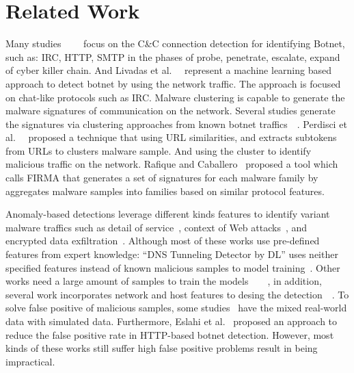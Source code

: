 \section{Related Work}

Many studies~\cite{feily2009survey}~\cite{barford2007inside}~\cite{strayer2008botnet}~\cite{atluri2017botnets} focus on the C\&C connection detection for identifying Botnet, such as: IRC, HTTP, SMTP in the phases of probe, penetrate, escalate, expand of cyber killer chain. And Livadas et al.~\cite{carl2006using}~\cite{strayer2006detecting} represent a machine learning based approach to detect botnet by using the network traffic. The approach is focused on chat-like protocols such as IRC. Malware clustering is capable to generate the malware signatures of communication on the network. Several studies generate the signatures via clustering approaches from known botnet traffics~\cite{p:zarras14}~\cite{nelms2013execscent}. Perdisci et al.~\cite{perdisci2013scalable}~\cite{perdisci2010behavioral} proposed a technique that using URL similarities, and extracts subtokens from URLs to clusters malware sample. And using the cluster to identify malicious traffic on the network. Rafique and Caballero~\cite{rafique2013firma} proposed a tool which calls FIRMA that generates a set of signatures for each malware family by aggregates malware samples into families based on similar protocol features.  

Anomaly-based detections leverage different kinds features to identify variant malware traffics such as detail of service~\cite{p:feinstein03}, context of Web attacks~\cite{p:krugel03}, and encrypted data exfiltration~\cite{p:he14}.  Although most of these works use pre-defined features from expert knowledge: “DNS Tunneling Detector by DL” uses neither specified features instead of known malicious samples to model training~\cite{j:zhang16}. Other works need a large amount of samples to train the models~\cite{bilge2012disclosure}~\cite{gu2008botminer}~\cite{binkley2006algorithm}~\cite{karasaridis2007wide}, in addition, several work incorporates network and host features to desing the detection~\cite{p:schwenk11}~\cite{borders2004web}.  To solve false positive of malicious samples, some studies~\cite{wang2018botcapturer} have the mixed real-world data with simulated data. Furthermore, Eslahi et al.~\cite{eslahi2013efficient} proposed an approach to reduce the false positive rate in HTTP-based botnet detection. However, most kinds of these works still suffer high false positive problems result in being impractical.

